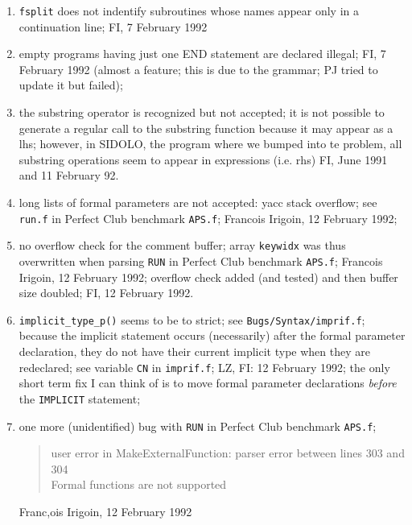 \begin{enumerate}
  \item \verb+fsplit+ does not indentify subroutines whose names appear
        only in a continuation line; FI, 7 February 1992

  \item empty programs having just one END statement are declared illegal;
        FI, 7 February 1992 (almost a feature; this is due to the grammar;
        PJ tried to update it but failed);

  \item the substring operator is recognized but not accepted; it is not
        possible to generate a regular call to the substring function
        because it may appear as a lhs; however, in SIDOLO, the program
        where we bumped into te problem, all substring operations seem
        to appear in expressions (i.e. rhs)
        FI, June 1991 and 11 February 92.

  \item long lists of formal parameters are not accepted: yacc stack overflow;
        see \verb+run.f+ in Perfect Club benchmark \verb+APS.f+;
        Francois Irigoin, 12 February 1992; 

  \item no overflow check for the comment buffer; array \verb+keywidx+ was thus
        overwritten when parsing \verb+RUN+ in 
        Perfect Club benchmark \verb+APS.f+; Francois Irigoin, 12
        February 1992; overflow check added (and tested) and then
        buffer size doubled; FI, 12 February 1992.

  \item \verb+implicit_type_p()+ seems to be to strict; 
        see \verb+Bugs/Syntax/imprif.f+; because the implicit statement
        occurs (necessarily) after the formal parameter declaration, they
        do not have their current implicit type when they are redeclared;
        see variable \verb+CN+ in \verb+imprif.f+; LZ, FI: 12 February 1992;
        the only short term fix I can think of is to move formal parameter
        declarations {\em before} the \verb+IMPLICIT+ statement;

  \item one more (unidentified) bug with \verb+RUN+ in 
        Perfect Club benchmark \verb+APS.f+; 
        \begin{quote}
        user error in MakeExternalFunction: parser error between lines 303
        and 304 \\
        Formal functions are not supported
        \end{quote}
        Franc,ois Irigoin, 12 February 1992


\end{enumerate}
